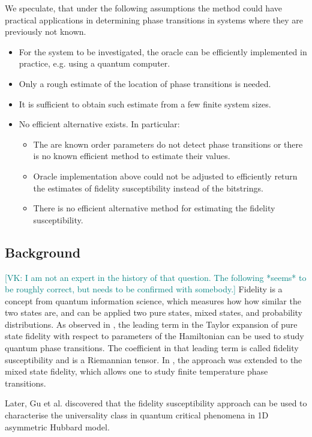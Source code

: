 \documentclass[american,aps,pra,reprint,floatfix,nofootinbib,superscriptaddress]{revtex4-2}
\newcommand{\VK}[1]{\textcolor{teal}{[VK: #1]}}
\begin{document}
We speculate, that under the following assumptions the method could have
practical applications in determining phase transitions in systems where they
are previously not known.
\begin{itemize}
  \item For the system to be investigated, the oracle can be efficiently
    implemented in practice, e.g. using a quantum computer.
  \item Only a rough estimate of the location of phase transitions is needed.
  \item It is sufficient to obtain such estimate from a few finite system
    sizes.
  \item No efficient alternative exists. In particular:
    \begin{itemize}
      \item The are known order parameters do not detect phase transitions
        or there is no known efficient method to estimate their values.
      \item Oracle implementation above could not be adjusted to efficiently
        return the estimates of fidelity susceptibility instead of the
        bitstrings.
      \item There is no efficient alternative method for estimating the
        fidelity susceptibility.
    \end{itemize}
\end{itemize}

\subsection{Background}
\VK{I am not an expert in the history of that question. The following *seems*
to be roughly correct, but needs to be confirmed with somebody.}
Fidelity is a concept from quantum information science, which measures how
how similar the two states are, and can be applied two pure states, mixed
states, and probability distributions. As observed in
\cite{zanardi2007information}, the leading term in the Taylor expansion
of pure state fidelity with respect to parameters of the Hamiltonian can be used
to study quantum phase transitions. The coefficient in that leading term is
called fidelity susceptibility and is a Riemannian tensor.
In \cite{zanardi2007mixed}, the approach was extended to the mixed state
fidelity, which allows one to study finite temperature phase transitions.

Later, Gu et al. \cite{gu2008fidelity} discovered that the fidelity
susceptibility approach can be used to characterise the universality class in
quantum critical phenomena in 1D asymmetric Hubbard model.
\end{document}
